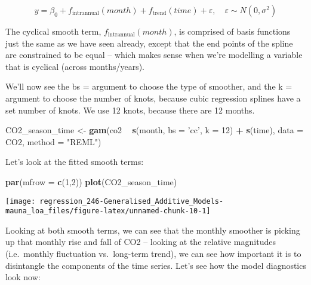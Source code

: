 \documentclass[]{book}
\newenvironment{Shaded}{\begin{snugshade}}{\end{snugshade}}
\newcommand{\DataTypeTok}[1]{\textcolor[rgb]{0.13,0.29,0.53}{#1}}
\newcommand{\DecValTok}[1]{\textcolor[rgb]{0.00,0.00,0.81}{#1}}
\newcommand{\KeywordTok}[1]{\textcolor[rgb]{0.13,0.29,0.53}{\textbf{#1}}}
\newcommand{\NormalTok}[1]{#1}
\newcommand{\OperatorTok}[1]{\textcolor[rgb]{0.81,0.36,0.00}{\textbf{#1}}}
\newcommand{\StringTok}[1]{\textcolor[rgb]{0.31,0.60,0.02}{#1}}
\begin{document}
\[ y = \beta_0 + f_{\mathrm{intrannual}}(month) + f_{\mathrm{trend}}(time) + \varepsilon, \quad \varepsilon \sim N(0, \sigma^2)\]

The cyclical smooth term, \(f_{\mathrm{intrannual}}(month)\), is comprised of basis functions just the same as we have seen already, except that the end points of the spline are constrained to be equal -- which makes sense when we're modelling a variable that is cyclical (across months/years).

We'll now see the bs = argument to choose the type of smoother, and the k = argument to choose the number of knots, because cubic regression splines have a set number of knots. We use 12 knots, because there are 12 months.

\begin{Shaded}
\begin{Highlighting}[]
\NormalTok{CO2_season_time <-}\StringTok{ }\KeywordTok{gam}\NormalTok{(co2 }\OperatorTok{~}\StringTok{ }\KeywordTok{s}\NormalTok{(month, }\DataTypeTok{bs =} \StringTok{'cc'}\NormalTok{, }\DataTypeTok{k =} \DecValTok{12}\NormalTok{) }\OperatorTok{+}\StringTok{ }\KeywordTok{s}\NormalTok{(time), }
                       \DataTypeTok{data =}\NormalTok{ CO2, }
                       \DataTypeTok{method =} \StringTok{"REML"}\NormalTok{)}
\end{Highlighting}
\end{Shaded}

Let's look at the fitted smooth terms:

\begin{Shaded}
\begin{Highlighting}[]
\KeywordTok{par}\NormalTok{(}\DataTypeTok{mfrow =} \KeywordTok{c}\NormalTok{(}\DecValTok{1}\NormalTok{,}\DecValTok{2}\NormalTok{))}
\KeywordTok{plot}\NormalTok{(CO2_season_time)}
\end{Highlighting}
\end{Shaded}

\begin{center}\texttt{[image: regression\_246-Generalised\_Additive\_Models-mauna\_loa\_files/figure-latex/unnamed-chunk-10-1]} \end{center}

Looking at both smooth terms, we can see that the monthly smoother is picking up that monthly rise and fall of CO2 -- looking at the relative magnitudes (i.e.~monthly fluctuation vs.~long-term trend), we can see how important it is to disintangle the components of the time series. Let's see how the model diagnostics look now:
\end{document}

